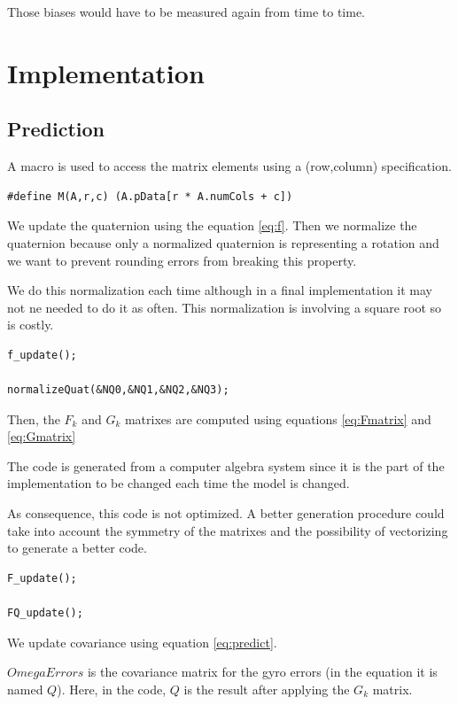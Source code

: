 \documentclass[titlepage,a4,12pt]{article}
\numberwithin{equation}{subsection}
\begin{document}
Those biases would have to be measured again from time to time.

\section{Implementation}
\subsection{Prediction}

A macro is used to access the matrix elements using a (row,column) specification.

\begin{verbatim}
#define M(A,r,c) (A.pData[r * A.numCols + c])
\end{verbatim}

We update the quaternion using the equation \ref{eq:f}.
Then we normalize the quaternion because only a normalized quaternion is representing a rotation and we want to prevent rounding errors from breaking this property.

We do this normalization each time although in a final implementation it may not ne needed to do it as often. This normalization is involving a square root so is costly.

\begin{verbatim}
f_update();

normalizeQuat(&NQ0,&NQ1,&NQ2,&NQ3);
\end{verbatim}

Then, the $F_k$ and $G_k$ matrixes are computed using equations \ref{eq:Fmatrix}
and \ref{eq:Gmatrix}

The code is generated from a computer algebra system since it is the part of the implementation to be changed each time the model is changed.

As consequence, this code is not optimized. A better generation procedure could take into account the symmetry of the matrixes and the possibility of vectorizing to generate a better code.

\begin{verbatim}
F_update();

FQ_update();
\end{verbatim}

We update covariance using equation \ref{eq:predict}.

$OmegaErrors$ is the covariance matrix for the gyro errors (in the equation it is named $Q$). Here, in the code, $Q$ is the result after applying the $G_k$ matrix.
\end{document}
